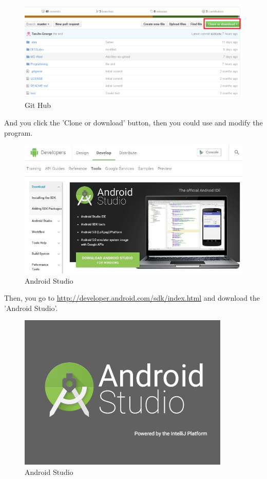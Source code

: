 \documentclass[conference]{IEEEtran}
\begin{document}
\begin{figure}[H]
\begin{center}
    \includegraphics[scale=0.33]{git3}
    \caption{Git Hub} 
\end{center}
\end{figure}

And you click the 'Clone or download' button, then you could use and modify the program.

\begin{figure}[H]
\begin{center}
    \includegraphics[scale=0.33]{android1}
    \caption{Android Studio} 
\end{center}
\end{figure}

Then, you go to 
\url{http://developer.android.com/sdk/index.html}
 and download the 'Android Studio'.

\begin{figure}[H]
\begin{center}
    \includegraphics[scale=0.88]{android2}
    \caption{Android Studio} 
\end{center}
\end{figure}
\end{document}
